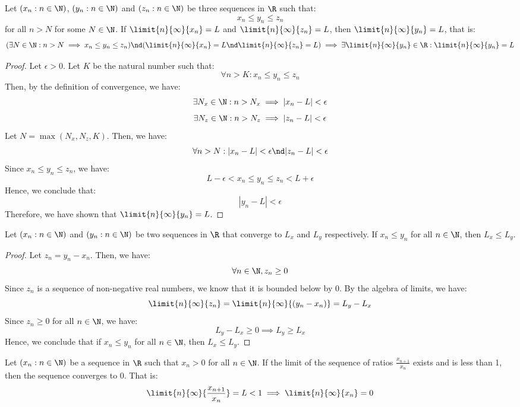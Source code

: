 \documentclass[openany]{book}
\begin{document}
\begin{mytheorem}
    Let $(x_n : n \in \N)$, $(y_n : n \in \N)$ and $(z_n : n \in \N)$ be three sequences in $\R$ such that:
    $$x_n \leq y_n \leq z_n$$
    for all $n > N$ for some $N \in \N$. If $\limit{n}{\infty}{x_n} = L$ and $\limit{n}{\infty}{z_n} = L$, then $\limit{n}{\infty}{y_n} = L$, that is: 
    $$(\exists N \in \N: n > N \implies x_n \leq y_n \leq z_n) \nd (\limit{n}{\infty}{x_n} = L \nd \limit{n}{\infty}{z_n} = L) \implies \exists \limit{n}{\infty}{y_n} \in \R : \limit{n}{\infty}{y_n} = L$$
\end{mytheorem}
\begin{proof}
    Let $\epsilon > 0$. Let $K$ be the natural number such that: 
    $$\forall n > K: x_n \leq y_n \leq z_n$$
    Then, by the definition of convergence, we have:
    $$\exists N_x \in \N: n > N_x \implies |x_n - L| < \epsilon$$
    $$\exists N_z \in \N: n > N_z \implies |z_n - L| < \epsilon$$
    Let $N = \max(N_x, N_z, K)$. Then, we have:
    $$\forall n > N: |x_n - L| < \epsilon \nd |z_n - L| < \epsilon$$
    Since $x_n \leq y_n \leq z_n$, we have:
    $$L - \epsilon < x_n \leq y_n \leq z_n < L + \epsilon$$
    Hence, we conclude that:
    $$|y_n - L| < \epsilon$$
    Therefore, we have shown that $\limit{n}{\infty}{y_n} = L$.
\end{proof}
\begin{mytheorem}
    Let $(x_n : n \in \N)$ and $(y_n : n \in \N)$ be two sequences in $\R$ that converge to $L_x$ and $L_y$ respectively. If $x_n \leq y_n$ for all $n \in \N$, then $L_x \leq L_y$.
\end{mytheorem}
\begin{proof}
    Let $z_n = y_n - x_n$. Then, we have:
    $$\forall n \in \N, z_n \geq 0$$
    Since $z_n$ is a sequence of non-negative real numbers, we know that it is bounded below by 0. By the algebra of limits, we have:
    $$\limit{n}{\infty}{z_n} = \limit{n}{\infty}{(y_n - x_n)} = L_y - L_x$$
    Since $z_n \geq 0$ for all $n \in \N$, we have:
    $$L_y - L_x \geq 0 \implies L_y \geq L_x$$
    Hence, we conclude that if $x_n \leq y_n$ for all $n \in \N$, then $L_x \leq L_y$.
\end{proof}
\begin{mytheorem}
    Let $(x_n : n \in \N)$ be a sequence in $\R$ such that $x_n > 0$ for all $n \in \N$. If the limit of the sequence of ratios $\frac{x_{n+1}}{x_n}$ exists and is less than 1, then the sequence converges to 0. That is:
    $$\limit{n}{\infty}{\frac{x_{n+1}}{x_n}} = L < 1 \implies \limit{n}{\infty}{x_n} = 0$$
\end{mytheorem}
\end{document}
